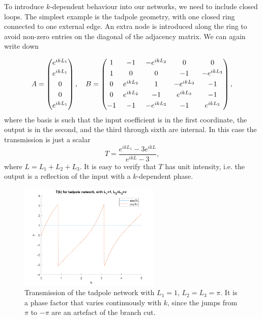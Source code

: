 To introduce $k$-dependent behaviour into our networks, we need to include closed loops. The simplest example is the tadpole geometry, with one closed ring connected to one external edge. An extra node is introduced along the ring to avoid non-zero entries on the diagonal of the adjacency matrix. We can again write down  

\begin{equation}
    \label{eq:AB_tadpole}
    \hspace{-3cm}
    A = \begin{pmatrix}
        e^{ikL_1}  \\[0.3em]
        e^{ikL_1}  \\[0.3em]
        0          \\[0.3em]
        0          \\[0.3em]
        e^{ikL_1}   \end{pmatrix}, 
      \quad
    B = \begin{pmatrix}
    1 & -1 & -e^{ikL_2} & 0 & 0 \\[0.3em]
    1 & 0 & 0 & -1 & -e^{ikL_3} \\[0.3em]
    0 & e^{ikL_2} & 1 & -e^{ikL_3} & -1 \\[0.3em]
    0 & e^{ikL_2} & -1 & e^{ikL_3} & -1 \\[0.3em]
    -1 & -1 & -e^{ikL_2} & -1 & e^{ikL_3} 
     \end{pmatrix},
     \hspace{-3cm}
\end{equation}
where the basis is such that the input coefficient is in the first coordinate, the output is in the second, and the third through sixth are internal. In this case the transmission is just a scalar
\begin{equation}
    \label{eq:T_tadpole}
    T=\frac{e^{ikL_1}-3e^{ikL}}{e^{ikL}-3},
\end{equation}
where $L=L_1+L_2+L_3$. It is easy to verify that $T$ has unit intensity, i.e. the output is a reflection of the input with a $k$-dependent phase.
\begin{figure}[h]
  \centering
    \includegraphics[width=0.6\textwidth]{ch2/fig2/tadpole_T.png}
    \caption{Transmission of the tadpole network with $L_1=1$, $L_2=L_3=\pi$. It is a phase factor that varies continuously with $k$, since the jumps from $\pi$ to $-\pi$ are an artefact of the branch cut.}
    \label{fig:T_tadpole}
\end{figure}

